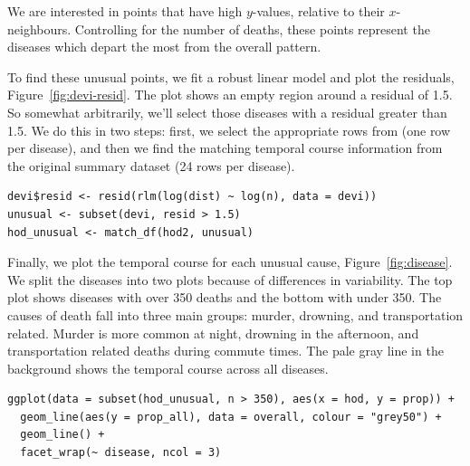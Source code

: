 \documentclass[article]{jss}
\begin{document}
We are interested in points that have high $y$-values, relative to their $x$-neighbours. Controlling for the number of deaths, these points represent the diseases which depart the most from the overall pattern.

To find these unusual points, we fit a robust linear model and plot the residuals,  Figure~\ref{fig:devi-resid}. The plot shows an empty region around a residual of 1.5. So somewhat arbitrarily, we'll select those diseases with a residual greater than 1.5. We do this in two steps: first, we select the appropriate rows from  (one row per disease), and then we find the matching temporal course information from the original summary dataset (24 rows per disease).

\begin{Verbatim}
devi$resid <- resid(rlm(log(dist) ~ log(n), data = devi))
unusual <- subset(devi, resid > 1.5)
hod_unusual <- match_df(hod2, unusual)
\end{Verbatim}

Finally, we plot the temporal course for each unusual cause, Figure~\ref{fig:disease}. We split the diseases into two plots because of differences in variability. The top plot shows diseases with over 350 deaths and the bottom with under 350. The causes of death fall into three main groups: murder, drowning, and transportation related. Murder is more common at night, drowning in the afternoon, and transportation related deaths during commute times. The pale gray line in the background shows the temporal course across all diseases.

\begin{Verbatim}
ggplot(data = subset(hod_unusual, n > 350), aes(x = hod, y = prop)) + 
  geom_line(aes(y = prop_all), data = overall, colour = "grey50") +
  geom_line() + 
  facet_wrap(~ disease, ncol = 3)
\end{Verbatim}
\end{document}
